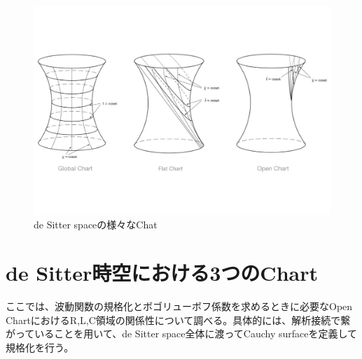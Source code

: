   \begin{figure}[H]
    \begin{center}
    \includegraphics[width=15cm,angle=0]{Web.pdf}
    \caption{de Sitter spaceの様々なChat}
    \label{vchart}
    \end{center}
  \end{figure}


\section{de Sitter時空における3つのChart}
ここでは、波動関数の規格化とボゴリューボフ係数を求めるときに必要なOpen ChartにおけるR,L,C領域の関係性について調べる。具体的には、解析接続で繋がっていることを用いて、de Sitter space全体に渡ってCauchy surfaceを定義して規格化を行う。
